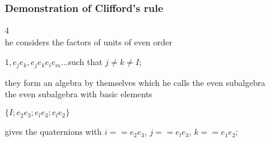 \begin{frame}\frametitle{Demonstration of Clifford’s rule }
4\\



he considers the factors of units of even order

\begin{center}
	$1, e_j e_k, e_j e_k e_i e_m...$such that $j \neq k \neq I$;
\end{center}
they form an algebra by themselves which he calls the even subalgebra \\

the even subalgebra with basic elements 
\begin{center}
	$\{I; e_2 e_3; e_l e_3; e_l e_2\}$
\end{center}
 gives the quaternions with $i == e_2 e_3$, $j == e_l e_3$, $k == e_1 e_2;$





\end{frame}
